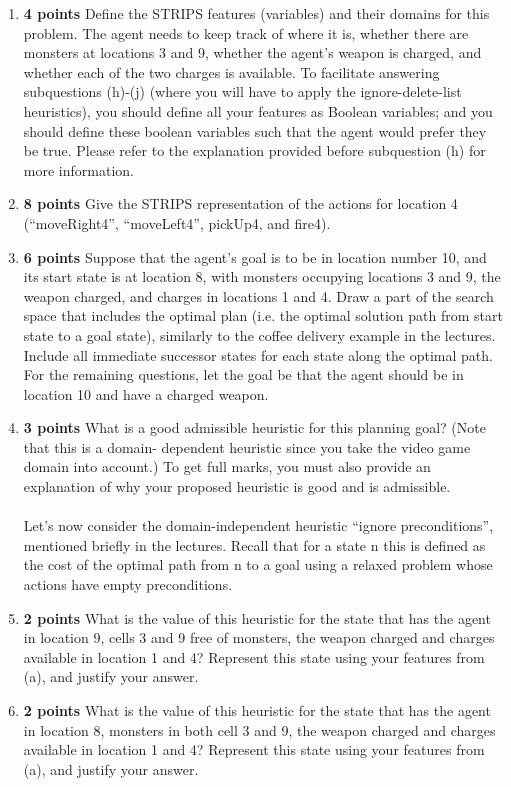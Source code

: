 \documentclass{article}
\begin{document}
\begin{enumerate}[label=(\alph*)]
    \item \textbf{4 points} Define the STRIPS features (variables) and their domains for this problem. The agent needs to keep track of where it is, whether there are monsters at locations 3 and 9, whether the agent’s weapon is charged, and whether each of the two charges is available. To facilitate answering subquestions (h)-(j) (where you will have to apply the ignore-delete-list heuristics), you should define all your features as Boolean variables; and you should define these boolean variables such that the agent would prefer they be true. Please refer to the explanation provided before subquestion (h) for more information.
    \item \textbf{8 points} Give the STRIPS representation of the actions for location 4 (“moveRight4”, “moveLeft4”, pickUp4, and fire4).
    \item \textbf{6 points} Suppose that the agent’s goal is to be in location number 10, and its start state is at location 8, with monsters occupying locations 3 and 9, the weapon charged, and charges in locations 1 and 4. Draw a part of the search space that includes the optimal plan (i.e. the optimal solution path from start state to a goal state), similarly to the coffee delivery example in the lectures. Include all immediate successor states for each state along the optimal path. For the remaining questions, let the goal be that the agent should be in location 10 and have a charged weapon.
    \item \textbf{3 points} What is a good admissible heuristic for this planning goal? (Note that this is a domain- dependent heuristic since you take the video game domain into account.) To get full marks, you must also provide an explanation of why your proposed heuristic is good and is admissible.\\ \\ Let’s now consider the domain-independent heuristic “ignore preconditions”, mentioned briefly in the lectures. Recall that for a state n this is defined as the cost of the optimal path from n to a goal using a relaxed problem whose actions have empty preconditions.
    \item \textbf{2 points} What is the value of this heuristic for the state that has the agent in location 9, cells 3 and 9 free of monsters, the weapon charged and charges available in location 1 and 4? Represent this state using your features from (a), and justify your answer.
    \item \textbf{2 points} What is the value of this heuristic for the state that has the agent in location 8, monsters in both cell 3 and 9, the weapon charged and charges available in location 1 and 4? Represent this state using your features from (a), and justify your answer.

\end{enumerate}
\end{document}
